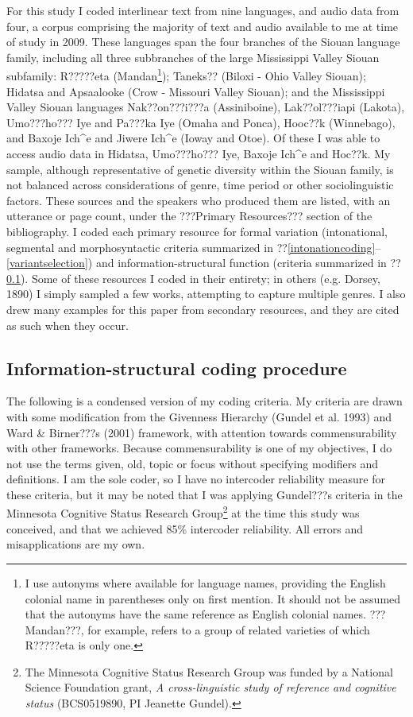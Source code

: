 \documentclass[output=paper]{LSP/langsci}
\begin{document}
For this study I coded interlinear text from nine languages, and audio data from four, a corpus comprising the majority of text and audio available to me at time of study in 2009. These languages span the four branches of the Siouan language family, including all three subbranches of the large Mississippi Valley Siouan subfamily: R?????eta (Mandan\footnote{I use autonyms where available for language names, providing the English colonial name in parentheses only on first mention. It should not be assumed that the autonyms have the same reference as English colonial names. ???Mandan???, for example, refers to a group of related varieties of which R?????eta is only one.}); Taneks?? (Biloxi - Ohio Valley Siouan); Hidatsa and Apsaalooke (Crow - Missouri Valley Siouan); and the Mississippi Valley Siouan languages Nak??on???i???a (Assiniboine), Lak??ol???iapi (Lakota), Umo???ho??? Iye and Pa???ka Iye (Omaha and Ponca), Hooc??k (Winnebago), and Baxoje Ich\^{}e and Jiwere Ich\^{}e (Ioway and Otoe). Of these I was able to access audio data in Hidatsa, Umo???ho??? Iye, Baxoje Ich\^{}e and Hoc??k. My sample, although representative of genetic diversity within the Siouan family, is not balanced across considerations of genre, time period or other sociolinguistic factors. These sources and the speakers who produced them are listed, with an utterance or page count, under the ???Primary Resources??? section of the bibliography. I coded each primary resource for formal variation (intonational, segmental and morphosyntactic criteria summarized in ??\ref{intonationcoding}--\ref{variantselection}) and information-structural function (criteria summarized in ??\ref{informationcoding}). Some of these resources I coded in their entirety; in others (e.g. Dorsey, 1890) I simply sampled a few works, attempting to capture multiple genres. I also drew many examples for this paper from secondary resources, and they are cited as such when they occur.

\subsection{Information-structural coding procedure}\label{informationcoding}

The following is a condensed version of my coding criteria. My criteria are drawn with some modification from the Givenness Hierarchy (Gundel et al. 1993) and Ward \& Birner???s (2001) framework, with attention towards commensurability with other frameworks. Because commensurability is one of my objectives, I do not use the terms given, old, topic or focus without specifying modifiers and definitions. I am the sole coder, so I have no intercoder reliability measure for these criteria, but it may be noted that I was applying Gundel???s criteria in the Minnesota Cognitive Status Research Group\footnote{The Minnesota Cognitive Status Research Group was funded by a National Science Foundation grant, \textit{A cross-linguistic study of reference and cognitive status} (BCS0519890, PI Jeanette Gundel).} at the time this study was conceived, and that we achieved 85\% intercoder reliability. All errors and misapplications are my own.
\end{document}
